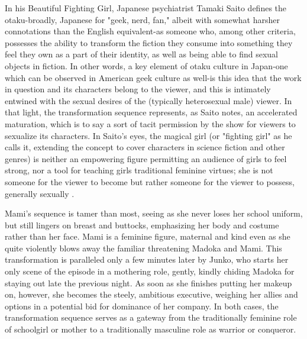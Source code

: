In his Beautiful Fighting Girl, Japanese psychiatrist Tamaki Saito defines the otaku-broadly, Japanese for "geek, nerd, fan," albeit with somewhat harsher connotations than the English equivalent-as someone who, among other criteria, possesses the ability to transform the fiction they consume into something they feel they own as a part of their identity, as well as being able to find sexual objects in fiction. In other words, a key element of otaku culture in Japan-one which can be observed in American geek culture as well-is this idea that the work in question and its characters belong to the viewer, and this is intimately entwined with the sexual desires of the (typically heterosexual male) viewer. In that light, the transformation sequence represents, as Saito notes, an accelerated maturation, which is to say a sort of tacit permission by the show for viewers to sexualize its characters. In Saito's eyes, the magical girl (or "fighting girl" as he calls it, extending the concept to cover characters in science fiction and other genres) is neither an empowering figure permitting an audience of girls to feel strong, nor a tool for teaching girls traditional feminine virtues; she is not someone for the viewer to become but rather someone for the viewer to possess, generally sexually \cite{ref29}. 

Mami's sequence is tamer than most, seeing as she never loses her school uniform, but still lingers on breast and buttocks, emphasizing her body and costume rather than her face. Mami is a feminine figure, maternal and kind even as she quite violently blows away the familiar threatening Madoka and Mami. This transformation is paralleled only a few minutes later by Junko, who starts her only scene of the episode in a mothering role, gently, kindly chiding Madoka for staying out late the previous night. As soon as she finishes putting her makeup on, however, she becomes the steely, ambitious executive, weighing her allies and options in a potential bid for dominance of her company. In both cases, the transformation sequence serves as a gateway from the traditionally feminine role of schoolgirl or mother to a traditionally masculine role as warrior or conqueror.

